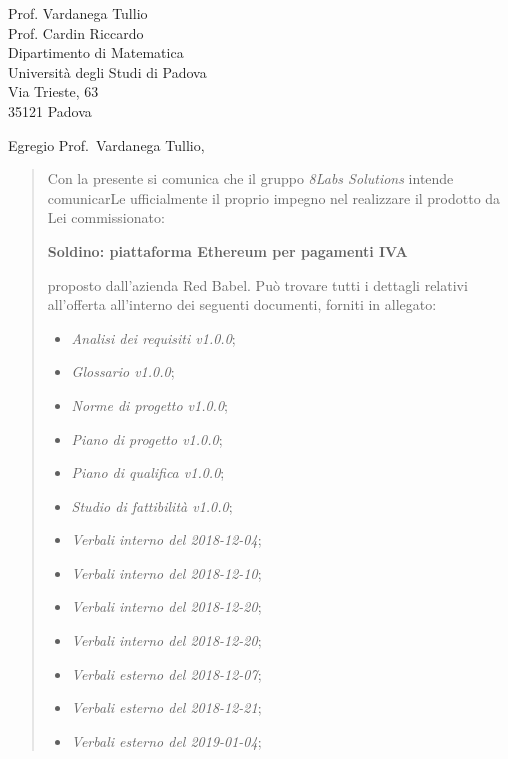 \begin{letter}{
		Prof. Vardanega Tullio \\
		Prof. Cardin Riccardo \\
		Dipartimento di Matematica \\
		Università degli Studi di Padova \\
		Via Trieste, 63 \\
		35121 Padova}
		
\opening{Egregio Prof.~Vardanega Tullio,}

\begin{quotation}
Con la presente si comunica che il gruppo \textit{8Labs Solutions} intende 
comunicarLe ufficialmente il proprio impegno nel realizzare il prodotto da Lei 
commissionato:

\begin{center}
	\textbf{Soldino: piattaforma Ethereum per pagamenti IVA}
\end{center}

\noindent proposto dall'azienda Red Babel.
Può trovare tutti i dettagli relativi all'offerta all'interno dei seguenti 
documenti, forniti in allegato:

\begin{itemize}
	\item \textit{Analisi dei requisiti v1.0.0};
	
	\item \textit{Glossario v1.0.0};
	
	\item \textit{Norme di progetto v1.0.0};

	\item \textit{Piano di progetto v1.0.0};

	\item \textit{Piano di qualifica v1.0.0};

	\item \textit{Studio di fattibilità v1.0.0};

	\item \textit{Verbali interno del 2018-12-04};
	\item \textit{Verbali interno del 2018-12-10};
	\item \textit{Verbali interno del 2018-12-20};
	\item \textit{Verbali interno del 2018-12-20};
	
	\item \textit{Verbali esterno del 2018-12-07};
	\item \textit{Verbali esterno del 2018-12-21};
	\item \textit{Verbali esterno del 2019-01-04};
\end{itemize}


\end{quotation}
\end{letter}
